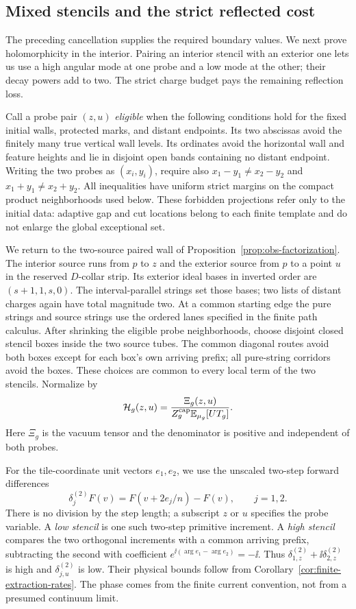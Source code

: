 \subsection{Mixed stencils and the strict reflected cost}
\label{obs:mixed-section}

The preceding cancellation supplies the required boundary values.
We next prove holomorphicity in the interior.  Pairing an interior
stencil with an exterior one lets us use a high angular mode at one
probe and a low mode at the other; their decay powers add to two.
The strict charge budget pays the remaining reflection loss.

Call a probe pair $(z,u)$ \emph{eligible} when the following
conditions hold for the fixed initial walls, protected marks, and
distant endpoints.  Its two abscissas avoid the finitely many true
vertical wall levels.  Its ordinates avoid the horizontal wall and
feature heights and lie in disjoint open bands containing no
distant endpoint.  Writing the two probes as $(x_i,y_i)$, require
also $x_1-y_1\ne x_2-y_2$ and $x_1+y_1\ne x_2+y_2$.  All
inequalities have uniform strict margins on the compact product
neighborhoods used below.  These forbidden projections refer only
to the initial data: adaptive gap and cut locations belong to each
finite template and do not enlarge the global exceptional set.

We return to the two-source paired wall of
Proposition~\ref{prop:obs-factorization}.  The interior source runs
from $p$ to $z$ and the exterior source from $p$ to a point $u$ in
the reserved $D$-collar strip.  Its exterior ideal bases in inverted
order are $(s+1,1,s,0)$.  The interval-parallel strings set those bases;
two lists of distant charges again have total magnitude two.  At a
common starting edge the pure strings and source strings use the
ordered lanes specified in the finite path calculus.  After shrinking
the eligible probe neighborhoods, choose disjoint closed stencil boxes
inside the two source tubes.  The common diagonal routes avoid both
boxes except for each box's own arriving prefix; all pure-string
corridors avoid the boxes.  These choices are common to every local
term of the two stencils.  Normalize by
\begin{equation}
 \mathcal H_g(z,u)=
 \frac{\Xi_g(z,u)}{Z_g^{\rm cap}\mathbb E_{\mu_g}[UT_g]}.
 \label{obs:mixed-normalization}
\end{equation}
Here $\Xi_g$ is the vacuum tensor and the denominator is positive
and independent of both probes.

For the tile-coordinate unit vectors $e_1,e_2$, we use the unscaled
two-step forward differences
\[
 \delta_j^{(2)}F(v)=F(v+2e_j/n)-F(v),\qquad j=1,2.
\]
There is no division by the step length; a subscript $z$ or $u$
specifies the probe variable.  A \emph{low stencil} is one such
two-step primitive increment.  A \emph{high stencil} compares the two
orthogonal increments with a common arriving prefix, subtracting the
second with coefficient $e^{\ii(\arg e_1-\arg e_2)}=-\ii$.
Thus $\delta_{1,z}^{(2)}+\ii\delta_{2,z}^{(2)}$ is high and
$\delta_{j,u}^{(2)}$ is low.  Their physical bounds follow from
Corollary~\ref{cor:finite-extraction-rates}.  The phase comes from the
finite current convention, not from a presumed continuum limit.

